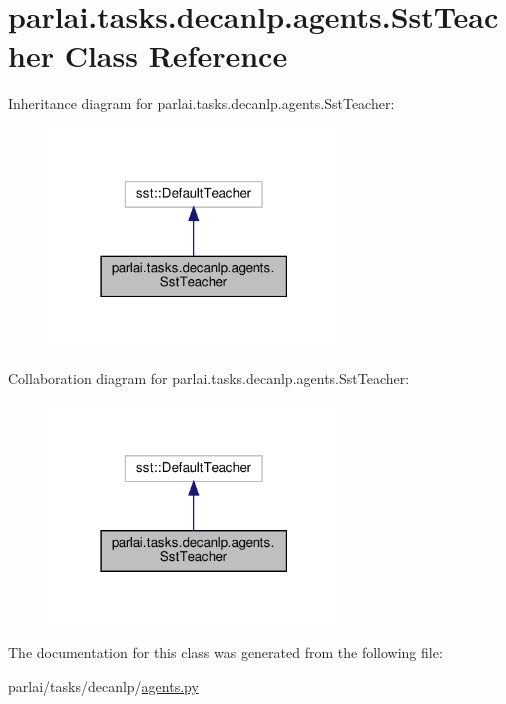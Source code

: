 \hypertarget{classparlai_1_1tasks_1_1decanlp_1_1agents_1_1SstTeacher}{}\section{parlai.\+tasks.\+decanlp.\+agents.\+Sst\+Teacher Class Reference}
\label{classparlai_1_1tasks_1_1decanlp_1_1agents_1_1SstTeacher}


Inheritance diagram for parlai.\+tasks.\+decanlp.\+agents.\+Sst\+Teacher\+:
\nopagebreak
\begin{figure}[H]
\begin{center}
\leavevmode
\includegraphics[width=219pt]{classparlai_1_1tasks_1_1decanlp_1_1agents_1_1SstTeacher__inherit__graph}
\end{center}
\end{figure}


Collaboration diagram for parlai.\+tasks.\+decanlp.\+agents.\+Sst\+Teacher\+:
\nopagebreak
\begin{figure}[H]
\begin{center}
\leavevmode
\includegraphics[width=219pt]{classparlai_1_1tasks_1_1decanlp_1_1agents_1_1SstTeacher__coll__graph}
\end{center}
\end{figure}


The documentation for this class was generated from the following file\+:\begin{DoxyCompactItemize}
\item 
parlai/tasks/decanlp/\hyperlink{parlai_2tasks_2decanlp_2agents_8py}{agents.\+py}\end{DoxyCompactItemize}
